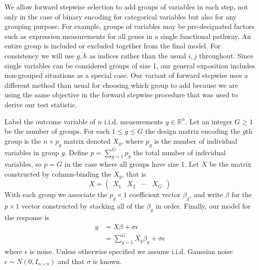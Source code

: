 \documentclass{imsart}
\newcommand{\todo}{\textcolor{red}{\textbf{To do: }}}
\newcommand{\real}{\mathbb{R}}
\begin{document}
We allow forward stepwise selection to add groups of variables in each
step, not only in the case of binary encoding for categorical
variables but also for any grouping purpose. For example, groups of
variables may be pre-designated factors such as expression
measurements for all genes in a single functional pathway. An entire
group is included or excluded together from the final model. For
consistency we will use $g, h$ as indices rather than the usual $i, j$
throughout. Since single variables can be considered groups of size 1,
our general exposition includes non-grouped situations as a special
case. Our variant of forward stepwise uses a different method than
usual for choosing which group to add because we are using the
same objective in the forward stepwise procedure that was used to
derive our test statistic.

Label the outcome variable of $n$ i.i.d. measurements $y \in \real^n$. Let an integer $G \geq 1$ 
be the number of groups. For each $1 \leq g \leq G$ the design matrix encoding the
$g$th group is the $n \times p_g$ matrix denoted $X_g$, where $p_g$ is
the number of individual variables in group $g$. Define $p = \sum_{g=1}^G
p_g$ the total number of individual variables, so $p = G$ in the
case where all groups have size 1. Let $X$ be the matrix constructed
by column-binding the $X_g$, that is  
\begin{equation*}
X = \begin{pmatrix} X_1 & X_2 & \cdots & X_G  \end{pmatrix}
\end{equation*}
With each group we associate the $p_g \times 1$ coefficient vector
$\beta_g$, and write $\beta$ for the $p \times 1$ vector constructed
by stacking all of the $\beta_g$ in order.  Finally, our model for the
response is
\begin{equation}
\begin{aligned}
\label{eq:gmodel}
y & = X \beta + \sigma \epsilon \\
   & = \sum_{g=1}^G X_g \beta_g + \sigma \epsilon
\end{aligned}
\end{equation}
where $\epsilon$ is noise. Unless otherwise specified we assume
i.i.d. Gaussian noise $\epsilon \sim N(0, I_{n \times n})$ and that
$\sigma$ is known.
\end{document}
